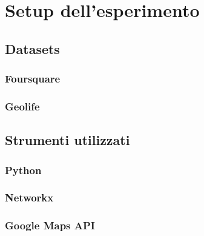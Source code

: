 
\chapter{Setup dell'esperimento} %
\label{Capitolo 3}


\section{Datasets}
\subsection{Foursquare}
\subsection{Geolife}
\section{Strumenti utilizzati}
\subsection{Python}
\subsection{Networkx}
\subsection{Google Maps API}